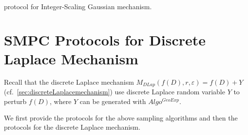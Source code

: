       \begin{protocol}[tbh!]
            \centering
            \caption{\smpc protocol for Integer-Scaling Gaussian mechanism.}
            \label{prot:ISGauss}
      \end{protocol}
      \FloatBarrier


      \section{SMPC Protocols for Discrete Laplace Mechanism}
      \label{sec:MPCProtocolsforDiscreteLaplaceMechanism}

      Recall that the discrete Laplace mechanism $M_{DLap}\left(f\left(D\right),r,\varepsilon\right)=f\left(D\right) +Y$ (cf.~\autoref{sec:discreteLaplacemechanism}) use discrete Laplace random variable $Y $ to perturb $f\left(D\right)$, where $Y$ can be generated with $Algo^{GeoExp}$.


      We first provide the \smpc protocols for the above sampling algorithms and then the \smpc protocols for the discrete Laplace mechanism.



